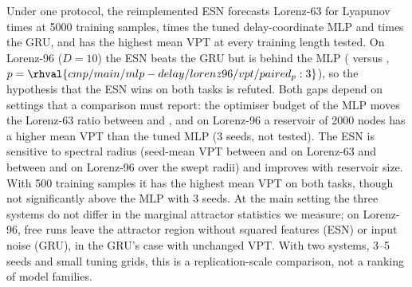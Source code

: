 Under one protocol, the reimplemented ESN forecasts Lorenz-63 for  Lyapunov times at 5000 training samples,  times the tuned delay-coordinate MLP and  times the GRU, and has the highest mean VPT at every training length tested. On Lorenz-96 ($D=10$) the ESN beats the GRU but is behind the MLP ( versus , $p=\rhval{cmp/main/mlp-delay/lorenz96/vpt/paired_p:3}$), so the hypothesis that the ESN wins on both tasks is refuted. Both gaps depend on settings that a comparison must report: the optimiser budget of the MLP moves the Lorenz-63 ratio between  and , and on Lorenz-96 a reservoir of 2000 nodes has a higher mean VPT than the tuned MLP (3 seeds, not tested). The ESN is sensitive to spectral radius (seed-mean VPT between  and  on Lorenz-63 and between  and  on Lorenz-96 over the swept radii) and improves with reservoir size. With 500 training samples it has the highest mean VPT on both tasks, though not significantly above the MLP with 3 seeds. At the main setting the three systems do not differ in the marginal attractor statistics we measure; on Lorenz-96, free runs leave the attractor region without squared features (ESN) or input noise (GRU), in the GRU's case with unchanged VPT. With two systems, 3--5 seeds and small tuning grids, this is a replication-scale comparison, not a ranking of model families.
